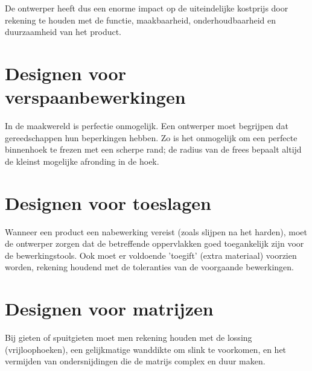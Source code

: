 \documentclass[a4paper,12pt,twoside]{report}
\begin{document}

De ontwerper heeft dus een enorme impact op de uiteindelijke kostprijs door rekening te houden met de functie, maakbaarheid, onderhoudbaarheid en duurzaamheid van het product.

\section{Designen voor verspaanbewerkingen}
In de maakwereld is perfectie onmogelijk. Een ontwerper moet begrijpen dat gereedschappen hun beperkingen hebben. Zo is het onmogelijk om een perfecte binnenhoek te frezen met een scherpe rand; de radius van de frees bepaalt altijd de kleinst mogelijke afronding in de hoek.


\section{Designen voor toeslagen}
Wanneer een product een nabewerking vereist (zoals slijpen na het harden), moet de ontwerper zorgen dat de betreffende oppervlakken goed toegankelijk zijn voor de bewerkingstools. Ook moet er voldoende 'toegift' (extra materiaal) voorzien worden, rekening houdend met de toleranties van de voorgaande bewerkingen.


\section{Designen voor matrijzen}
Bij gieten of spuitgieten moet men rekening houden met de lossing (vrijloophoeken), een gelijkmatige wanddikte om slink te voorkomen, en het vermijden van ondersnijdingen die de matrijs complex en duur maken.
\end{document}
